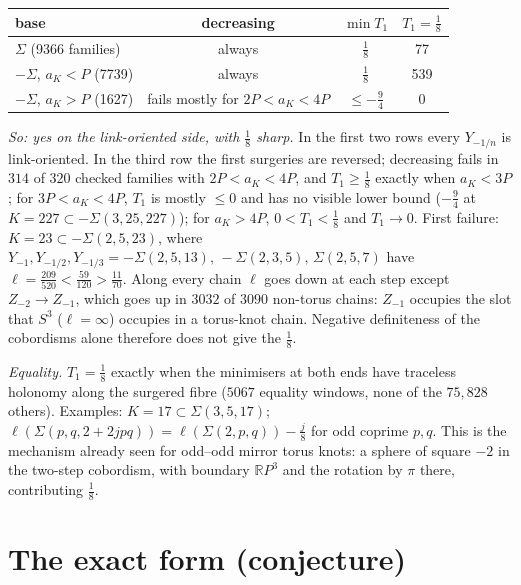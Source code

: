 \documentclass[10pt]{amsart}
\newcommand{\st}[1]{\par\noindent\textit{#1}\enspace}
\begin{document}
\begin{center}\small
\begin{tabular}{lccc}
base & decreasing & $\min T_1$ & $T_1=\frac18$\\\hline
$\Sigma$ (9366 families) & always & $\frac18$ & 77\\
$-\Sigma$, $a_K<P$ (7739) & always & $\frac18$ & 539\\
$-\Sigma$, $a_K>P$ (1627) & fails mostly for $2P<a_K<4P$ & $\le-\frac94$ & 0
\end{tabular}
\end{center}

\noindent\emph{So: yes on the link-oriented side, with $\frac18$ sharp.} In the
first two rows every $Y_{-1/n}$ is link-oriented. In the third row the first
surgeries are reversed; decreasing fails in $314$ of $320$ checked families with $2P<a_K<4P$, and $T_1\ge\frac18$ exactly when $a_K<3P$; for
$3P<a_K<4P$, $T_1$ is mostly $\le0$ and has no visible lower bound ($-\frac94$ at $K=227\subset-\Sigma(3,25,227)$); for $a_K>4P$, $0<T_1<\frac18$ and
$T_1\to0$. First failure: $K=23\subset-\Sigma(2,5,23)$, where $Y_{-1},Y_{-1/2},
Y_{-1/3}=-\Sigma(2,5,13),\,-\Sigma(2,3,5),\,\Sigma(2,5,7)$ have
$\ell=\frac{209}{520}<\frac{59}{120}>\frac{11}{70}$. Along every chain $\ell$
goes down at each step except $Z_{-2}\to Z_{-1}$, which goes up in $3032$ of
$3090$ non-torus chains: $Z_{-1}$ occupies the slot that $S^3$ ($\ell=\infty$)
occupies in a torus-knot chain. Negative definiteness of the cobordisms alone
therefore does not give the $\frac18$.

\st{Equality.} $T_1=\frac18$ exactly when the minimisers at both ends have
traceless holonomy along the surgered fibre ($5067$ equality windows, none of
the $75{,}828$ others). Examples: $K=17\subset\Sigma(3,5,17)$;
$\ell(\Sigma(p,q,2+2jpq))=\ell(\Sigma(2,p,q))-\frac j8$ for odd coprime $p,q$.
This is the mechanism already seen for odd--odd mirror torus knots: a
sphere of square $-2$ in the two-step cobordism, with boundary $\mathbb RP^3$
and the rotation by $\pi$ there, contributing $\frac18$.

\section{The exact form (conjecture)}
\end{document}
